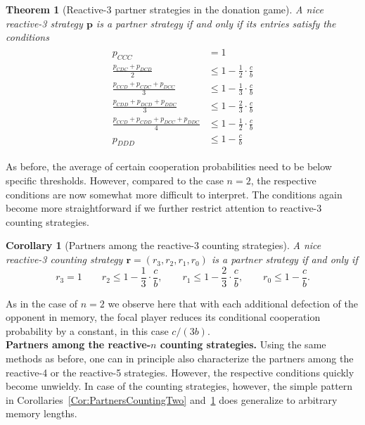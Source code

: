 \documentclass[11pt]{article}
\theoremstyle{plainCl1}
\newtheorem{theorem}{Theorem}
\newtheorem{corollary}{Corollary}
\theoremstyle{plainCl2}
\begin{document}
\begin{theorem}[Reactive-3 partner strategies in the donation game]\label{theorem:reactive_three_partner_strategies}
A nice reactive-3 strategy $\mathbf{p}$ is a partner strategy if and only if its entries satisfy the conditions
\begin{align}\label{eq:three_bit_conditions}
  \begin{split}
  p_{CCC} & = 1 \\
  \frac{p_{CDC} + p_{DCD}}{2} & \leq 1 - \frac{1}{2} \cdot \frac{c}{b} \\
  \frac{p_{CCD} + p_{CDC} + p_{DCC}}{3} & \leq 1 - \frac{1}{3} \cdot \frac{c}{b} \\
  \frac{p_{CDD} + p_{DCD} + p_{DDC}}{3} & \leq 1 - \frac{2}{3} \cdot \frac{c}{b} \\
  \frac{p_{CCD} + p_{CDD} + p_{DCC} + p_{DDC}}{4}  & \leq 1 - \frac{1}{2} \cdot \frac{c}{b}  \\
  p_{DDD} & \leq 1\!-\! \frac{c}{b}
  \end{split}
\end{align}
\end{theorem}

\noindent
As before, the average of certain cooperation probabilities need to be below specific thresholds. 
However, compared to the case $n\!=\!2$, the respective conditions are now somewhat more difficult to interpret. 
The conditions again become more straightforward if we further restrict attention to reactive-3 counting strategies. 

\begin{corollary}[Partners among the reactive-3 counting strategies]
\label{Cor:PartnersCountingThree}
A nice reactive-3 counting strategy $\mathbf{r} \!=\! (r_3, r_2, r_1, r_0)$ is a partner strategy if and only if
\begin{equation}\label{eq:counting_three_bit_conditions}
  \displaystyle r_3 \!=\! 1 \qquad r_2 \le 1\!-\! \frac{1}{3} \cdot \frac{c}{b}, \qquad r_1 \le 1\!-\! \frac{2}{3} \cdot \frac{c}{b}, \qquad  r_0 \le 1\!-\! \frac{c}{b}.
\end{equation}
\end{corollary}

\noindent
As in the case of $n\!=\!2$ we observe here that with each additional defection of the opponent in memory, the focal player reduces its conditional cooperation probability by a constant, in this case $c/(3b)$.\\

\noindent
{\bf Partners among the reactive-$n$ counting strategies.}
Using the same methods as before, one can in principle also characterize the partners among the reactive-4 or the reactive-5 strategies. However, the  respective conditions quickly become unwieldy. 
In case of the counting strategies, however, the simple pattern in Corollaries~\ref{Cor:PartnersCountingTwo} and~\ref{Cor:PartnersCountingThree} does generalize to arbitrary memory lengths. 
\end{document}

